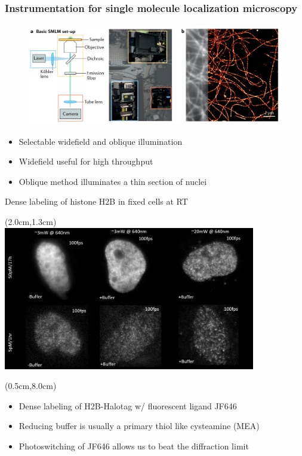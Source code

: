\documentclass{beamer}					%
\begin{document}
\begin{frame}
\frametitle{Instrumentation for single molecule localization microscopy}

\begin{figure}
\includegraphics[width=12cm]{Setup.png}
\end{figure}

\begin{itemize}
\item Selectable widefield and oblique illumination
\item Widefield useful for high throughput 
\item Oblique method illuminates a thin section of nuclei
\end{itemize}

\end{frame}

\begin{frame}{Dense labeling of histone H2B in fixed cells at RT}
\begin{textblock*}{11cm}(2.0cm,1.3cm)
\includegraphics[width=11cm]{Laser.png}
\end{textblock*}
\begin{textblock*}{\textwidth}(0.5cm,8.0cm)
\begin{itemize}
\item Dense labeling of H2B-Halotag w/ fluorescent ligand JF646
\item Reducing buffer is usually a primary thiol like cysteamine (MEA)
\item Photoswitching of JF646 allows us to beat the diffraction limit
\end{itemize}
\end{textblock*}
\end{frame}
\end{document}
